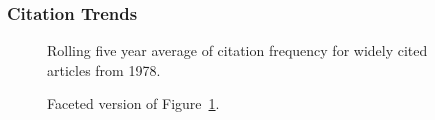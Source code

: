 \documentclass[
  10pt,
  letterpaper,
  DIV=11,
  numbers=noendperiod,
  twoside]{scrartcl}
\begin{document}
\subsubsection*{Citation Trends}\label{citation-trends-2}

\begin{figure}


\caption{\label{fig-citation-spaghetti-1978}Rolling five year average of
citation frequency for widely cited articles from 1978.}

\end{figure}%

\begin{figure}


\caption{\label{fig-citation-facet-1978}Faceted version of
Figure~\ref{fig-citation-spaghetti-1978}.}

\end{figure}%
\end{document}
